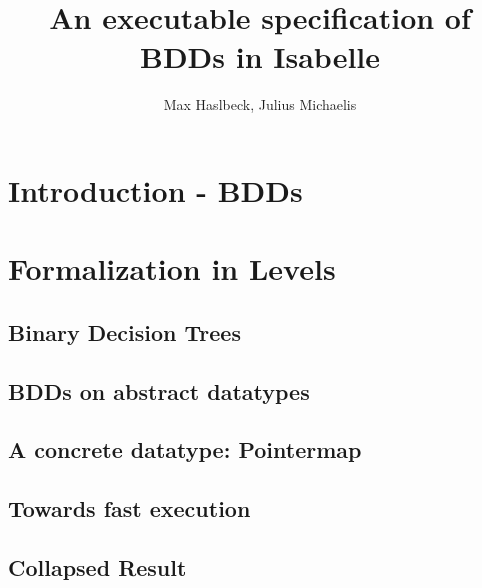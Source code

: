 \documentclass{beamer}
\title{An executable specification of BDDs in Isabelle}
\author{Max Haslbeck, Julius Michaelis}
\begin{document}
\frame{\titlepage}

\section{Introduction - BDDs}
\begin{frame}
\end{frame}
\section{Formalization in Levels}
\subsection{Binary Decision Trees}
\subsection{BDDs on abstract datatypes}
\subsection{A concrete datatype: Pointermap}
\subsection{Towards fast execution}
\subsection{Collapsed Result}
\begin{frame}
\end{frame}
\end{document}
